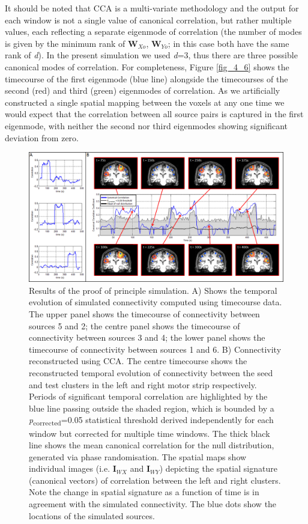 It should be noted that CCA is a multi-variate methodology and the output for each window is not a single value of canonical correlation, but rather multiple values, each reflecting a separate eigenmode of correlation (the number of modes is given by the minimum rank of $\mathbf{W}_{Xo}$, $\mathbf{W}_{Yo}$; in this case both have the same rank of \textit{d}). In the present simulation we used \textit{d}=3, thus there are three possible canonical modes of correlation. For completeness, Figure \ref{fig_4_6} shows the timecourse of the first eigenmode (blue line) alongside the timecourses of the second (red) and third (green) eigenmodes of correlation. As we artificially constructed a single spatial mapping between the voxels at any one time we would expect that the correlation between all source pairs is captured in the first eigenmode, with neither the second nor third eigenmodes showing significant deviation from zero.

\begin{figure}
	\includegraphics[width=\linewidth]{./images/chapter4/figure_5.png}\caption{Results of the proof of principle simulation. A) Shows the temporal evolution of simulated connectivity computed using timecourse data. The upper panel shows the timecourse of connectivity between sources 5 and 2; the centre panel shows the timecourse of connectivity between sources 3 and 4; the lower panel shows the timecourse of connectivity between sources 1 and 6. B) Connectivity reconstructed using CCA. The centre timecourse shows the reconstructed temporal evolution of connectivity between the seed and test clusters in the left and right motor strip respectively. Periods of significant temporal correlation are highlighted by the blue line passing outside the shaded region, which is bounded by a \textit{p}\textsubscript{corrected}=0.05 statistical threshold derived independently for each window but corrected for multiple time windows. The thick black line shows the mean canonical correlation for the null distribution, generated via phase randomisation. The spatial maps show individual images (i.e. $\mathbf{I}_{WX}$ and $\mathbf{I}_{WY}$) depicting the spatial signature (canonical vectors) of correlation between the left and right clusters. Note the change in spatial signature as a function of time is in agreement with the simulated connectivity. The blue dots show the locations of the simulated sources.}\label{fig_4_5}
\end{figure}

